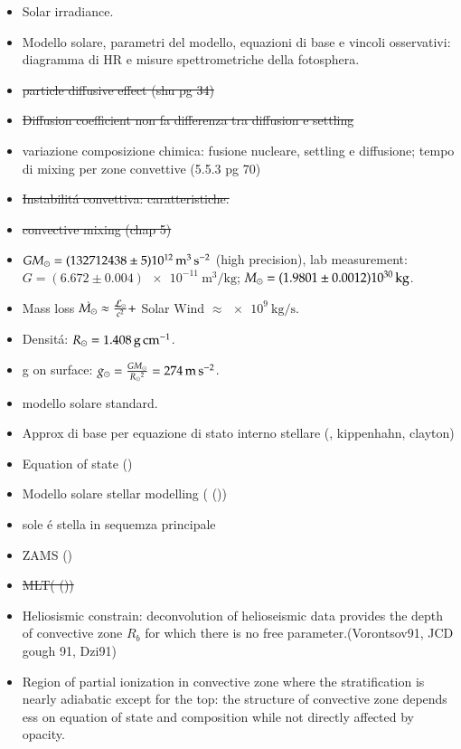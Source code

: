 \documentclass[../main.tex]{subfiles}
\begin{document}
{\begin{itemize}
Logaritmic abundances normalized to $n_H=\num{e12}$ particles per unit volume: $\log{A}=12+\frac{\log{n_i}}{\log{n_H}}$.
\item Solar irradiance.
\item Modello solare, parametri del modello, equazioni di base e vincoli osservativi: diagramma di HR e misure spettrometriche della fotosphera.
\item \sout{particle diffusive effect (shu pg 34)}
\item \sout{Diffusion coefficient non fa differenza tra diffusion e settling}
\item variazione composizione chimica: fusione nucleare, settling e diffusione; tempo di mixing per zone convettive (5.5.3 pg 70)
\item \sout{Instabilit\'a convettiva: caratteristiche.}
\item \sout{convective mixing (chap 5)}
\item $GM_{\odot}{}=(132712438\pm5)\SI{e12}{\cubic\meter\per\square\second}$ (high precision), lab measurement: $G=(6.672\pm0.004)\SI{e-11}{\cubic\meter\per\kilo\gram}$; $M_{\odot}{}=(1.9801\pm0.0012)\SI{e30}{\kilo\gram}$.
\item Mass loss $\dot{M_{\odot}{}}\approx\frac{\mathcal{L}_{\odot}{}}{c^2}+$ Solar Wind $\approx\SI{e9}{\kilo\gram\per\second}$.
\item Densit\'a: $\rsun{}=\SI{1.408}{\gram\per\cm}$.
\item g on surface: $g_{\odot}=\frac{GM_{\odot}}{R_{\odot}{}^2}=\SI{274}{\meter\per\square\second}$.
\item modello solare standard.
\item Approx di base per equazione di stato interno stellare (\sch{}, kippenhahn, clayton)
\item Equation of state (\cite{han12stellar})
\item Modello solare stellar modelling ( (\cite{han12stellar}))
\item sole \'e stella in sequemza principale
\item ZAMS (\cite{han12stellar})
\item \sout{MLT( (\cite{han12stellar}))}
\item Heliosismic constrain: deconvolution of helioseismic data provides the depth of convective zone $R_b$ for which there is no free parameter.(Vorontsov91, JCD gough 91, Dzi91)
\item Region of partial ionization in convective zone where the stratification is nearly adiabatic except for the top: the structure of convective zone depends ess on equation of state  and composition while not directly affected by opacity.

\end{itemize}}
\end{document}
